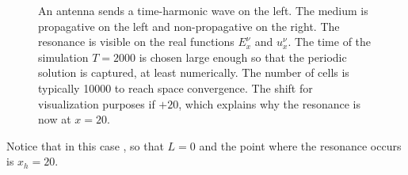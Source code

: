 \begin{figure}[h]
\begin{center}
\begin{tabular}{ccc}
			
		\end{tabular}   \end{center}
		\caption{An antenna sends a time-harmonic wave on the left. The medium is propagative
			on the left and non-propagative
			on the right. The resonance is visible on the real functions
			$E_x^\nu$ and $u_x^\nu$. The time of the simulation $T=2000$ is chosen large enough so that the
			periodic solution is captured, at least numerically. The number of cells
			is typically 10000 to reach space  convergence. The shift for visualization purposes if $+20$, which explains
			why the resonance is now at $x=20$.}
		\label{fig:vasl}
	\end{figure}
	
Notice that in this case ,
so that $L=0$ and the point where the resonance occurs is $x_h=20$.
\FloatBarrier

